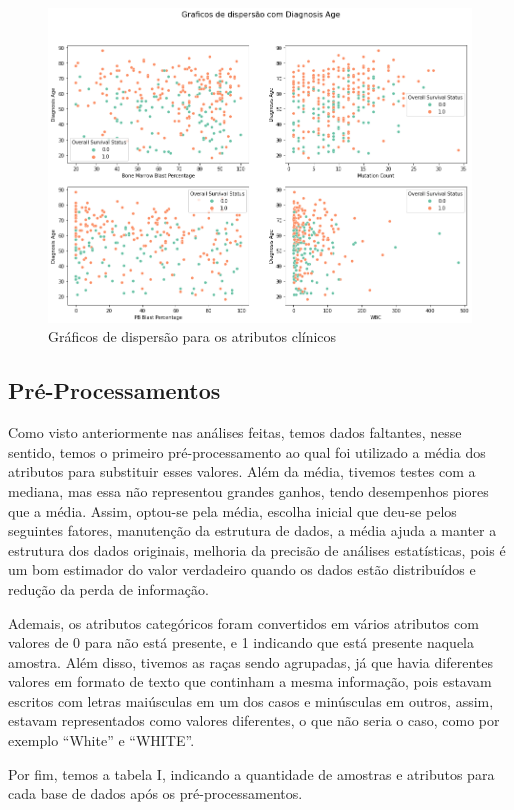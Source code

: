 \documentclass[10pt, conference, compsocconf]{IEEEtran}
\begin{document}
\begin{figure}
  \centering
  \includegraphics[width=.40\textwidth]{disp.png}
  \caption{Gráficos de dispersão para os atributos clínicos}
\label{fig:short}
\end{figure}

\subsection{Pré-Processamentos}
Como visto anteriormente nas análises feitas, temos dados faltantes, nesse sentido, temos o primeiro pré-processamento ao qual foi utilizado a média dos atributos para substituir esses valores. Além da média, tivemos testes com a mediana, mas essa não representou grandes ganhos, tendo desempenhos piores que a média. Assim, optou-se pela média, escolha inicial que deu-se pelos seguintes fatores, manutenção da estrutura de dados, a média ajuda a manter a estrutura dos dados originais, melhoria da precisão de análises estatísticas, pois é um bom estimador do valor verdadeiro quando os dados estão distribuídos e redução da perda de informação.

Ademais, os atributos categóricos foram convertidos em vários atributos com valores de 0 para não está presente, e 1 indicando que está presente naquela amostra. Além disso, tivemos as raças sendo agrupadas, já que havia diferentes valores em formato de texto que continham a mesma informação, pois estavam escritos com letras maiúsculas em um dos casos e minúsculas em outros, assim, estavam representados como valores diferentes, o que não seria o caso, como por exemplo “White” e “WHITE”.

Por fim, temos a tabela I, indicando a quantidade de amostras e atributos para cada base de dados após os pré-processamentos. 

\begin{table}[]
\caption{Quantidade de amostras e atributos nas bases}
\centering
{}
\end{table}
\end{document}
